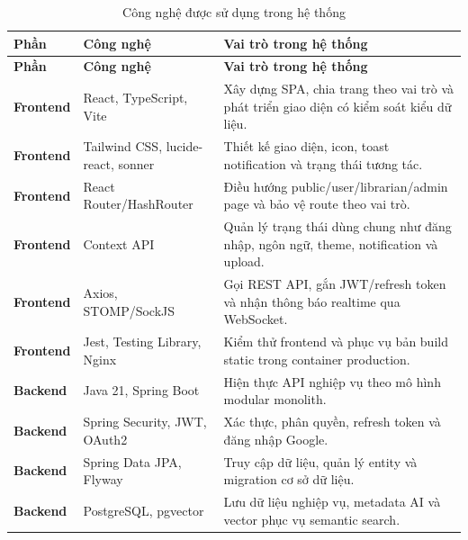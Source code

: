 \begingroup
\small
\renewcommand{\arraystretch}{1.18}
\setlength{\tabcolsep}{4pt}
\begin{xltabular}{\linewidth}{|p{2.2cm}|p{4.1cm}|X|}
\caption{Công nghệ được sử dụng trong hệ thống}
\label{tab:technologies_used} \\

\hline
\textbf{Phần} &
\textbf{Công nghệ} &
\textbf{Vai trò trong hệ thống} \\
\hline
\endfirsthead

\hline
\textbf{Phần} &
\textbf{Công nghệ} &
\textbf{Vai trò trong hệ thống} \\
\hline
\endhead

\textbf{Frontend} &
React, TypeScript, Vite &
Xây dựng SPA, chia trang theo vai trò và phát triển giao diện có kiểm soát kiểu dữ liệu. \\
\hline

\textbf{Frontend} &
Tailwind CSS, lucide-react, sonner &
Thiết kế giao diện, icon, toast notification và trạng thái tương tác. \\
\hline

\textbf{Frontend} &
React Router/HashRouter &
Điều hướng public/user/librarian/admin page và bảo vệ route theo vai trò. \\
\hline

\textbf{Frontend} &
Context API &
Quản lý trạng thái dùng chung như đăng nhập, ngôn ngữ, theme, notification và upload. \\
\hline

\textbf{Frontend} &
Axios, STOMP/SockJS &
Gọi REST API, gắn JWT/refresh token và nhận thông báo realtime qua WebSocket. \\
\hline

\textbf{Frontend} &
Jest, Testing Library, Nginx &
Kiểm thử frontend và phục vụ bản build static trong container production. \\
\hline

\textbf{Backend} &
Java 21, Spring Boot &
Hiện thực API nghiệp vụ theo mô hình modular monolith. \\
\hline

\textbf{Backend} &
Spring Security, JWT, OAuth2 &
Xác thực, phân quyền, refresh token và đăng nhập Google. \\
\hline

\textbf{Backend} &
Spring Data JPA, Flyway &
Truy cập dữ liệu, quản lý entity và migration cơ sở dữ liệu. \\
\hline

\textbf{Backend} &
PostgreSQL, pgvector &
Lưu dữ liệu nghiệp vụ, metadata AI và vector phục vụ semantic search. \\
\hline


\end{xltabular}
